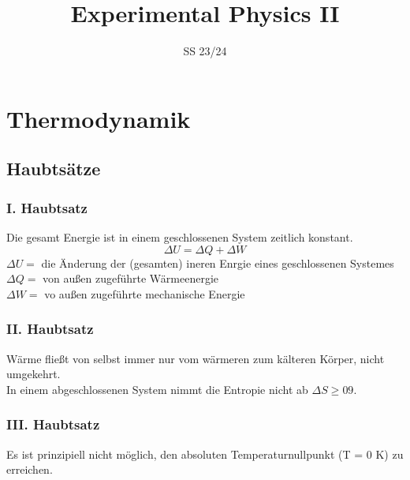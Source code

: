 \documentclass[twocolumn]{summery_3.1}
\title{Experimental Physics II}
\date{SS 23/24}
\begin{document}
\maketitle
\tableofcontents

\section{Thermodynamik}
\subsection{Haubtsätze}

 \subsubsection{I. Haubtsatz}
 {
    Die gesamt Energie ist in einem geschlossenen System zeitlich konstant.
    \begin{equation*}
        \Delta U = \Delta Q + \Delta W
    \end{equation*} 
    $\Delta U =$ die Änderung der (gesamten) ineren Enrgie eines geschlossenen Systemes\\
    $\Delta Q =$ von außen zugeführte Wärmeenergie\\
    $\Delta W =$ vo außen zugeführte mechanische Energie\\ 
 }

 \subsubsection{II. Haubtsatz}
 {
    Wärme fließt von selbst immer nur vom wärmeren zum kälteren Körper, nicht
    umgekehrt.\\
    In einem abgeschlossenen System nimmt die Entropie nicht ab $\Delta S \ge09$.
 }

 \subsubsection{III. Haubtsatz}
 {
    Es ist prinzipiell nicht möglich, den absoluten Temperaturnullpunkt (T = 0 K)
    zu erreichen.
 }
\end{document}

